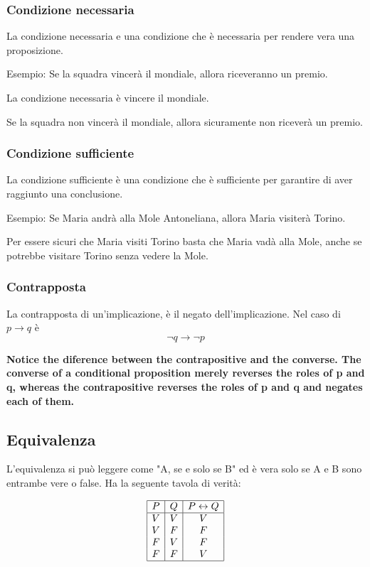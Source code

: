 \documentclass{article}
\begin{document}
\subsubsection{Condizione necessaria}

La condizione necessaria e una condizione che è necessaria per rendere vera una proposizione.

Esempio: Se la squadra vincerà il mondiale, allora riceveranno un premio.

La condizione necessaria è vincere il mondiale.

Se la squadra non vincerà il mondiale, allora sicuramente non riceverà un premio.

\subsubsection{Condizione sufficiente}

La condizione sufficiente è una condizione che è sufficiente per garantire di aver raggiunto una conclusione.

Esempio: Se Maria andrà alla Mole Antoneliana, allora Maria visiterà Torino.

Per essere sicuri che Maria visiti Torino basta che Maria vadà alla Mole, anche se potrebbe visitare Torino senza vedere la Mole.

\subsubsection{Contrapposta}

La contrapposta di un'implicazione, è il negato dell'implicazione. Nel caso di $ p \rightarrow q $ è 
$$ \neg q \rightarrow \neg p $$

\textbf{Notice the diference between the contrapositive and the converse. The converse of
	a conditional proposition merely reverses the roles of p and q, whereas the contrapositive
	reverses the roles of p and q and negates each of them.}
	
\subsection{Equivalenza}

L'equivalenza si può leggere come "A, se e solo se B" ed è vera solo se A e B sono entrambe vere o false. Ha la seguente tavola di verità:

\[
\begin{array}{|c|c|c|}
	\hline
	P & Q & P \leftrightarrow Q \\
	\hline
	V & V & V \\
	V & F & F \\
	F & V & F \\
	F & F & V \\
	\hline
\end{array}
\]
\end{document}
